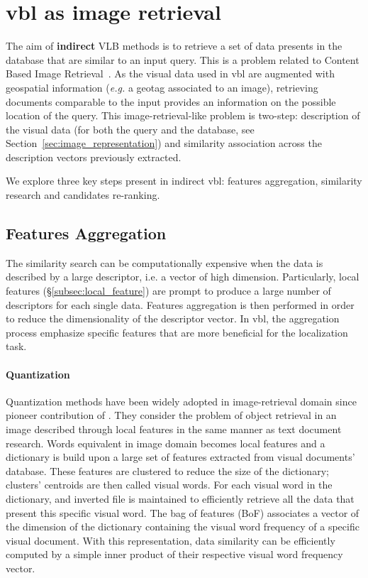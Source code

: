\section{\Ac{vbl} as image retrieval}
\label{sec:vbl_as_image_retrieval}
	The aim of \textbf{indirect} VLB methods is to retrieve a set of data presents in the database that are similar to an input query. This is a problem related to Content Based Image Retrieval~\citep{Zheng2017}. As the visual data used in \ac{vbl} are augmented with geospatial information (\textit{e.g.} a geotag associated to an image), retrieving documents comparable to the input provides an information on the possible location of the query. This image-retrieval-like problem is two-step: description of the visual data (for both the query and the database, see Section~\ref{sec:image_representation}) and similarity association across the description vectors previously extracted.
    
    We explore three key steps present in indirect \ac{vbl}: features aggregation, similarity research and candidates re-ranking. 
	
	\subsection{Features Aggregation}
	\label{subsec:features_aggregation}
		The similarity search can be computationally expensive when the data is described by a large descriptor, i.e. a vector of high dimension. Particularly, local features (\S\ref{subsec:local_feature}) are prompt to produce a large number of descriptors for each single data. Features aggregation is then performed in order to reduce the dimensionality of the descriptor vector. In \ac{vbl}, the aggregation process emphasize specific features that are more beneficial for the localization task.
		
		\paragraph{Quantization}
			Quantization methods have been widely adopted in image-retrieval domain since pioneer contribution of \citet{Sivic2003}. They consider the problem of object retrieval in an image described through local features in the same manner as text document research. Words equivalent in image domain becomes local features and a dictionary is build upon a large set of features extracted from visual documents' database. These features are clustered to reduce the size of the dictionary; clusters' centroids are then called visual words. For each visual word in the dictionary, and inverted file is maintained to efficiently retrieve all the data that present this specific visual word. The bag of features (BoF) associates a vector of the dimension of the dictionary containing the visual word frequency of a specific visual document. With this representation, data similarity can be efficiently computed by a simple inner product of their respective visual word frequency vector.
	       

